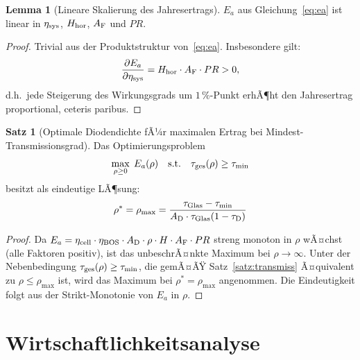 ﻿\documentclass[a4paper,12pt]{article}
\theoremstyle{definition}
\newtheorem{lemma}[definition]{Lemma}
\newtheorem{satz}[definition]{Satz}
\theoremstyle{remark}
\begin{document}
\begin{lemma}[Lineare Skalierung des Jahresertrags]
\label{lem:linear}
$E_a$ aus Gleichung~\eqref{eq:ea} ist linear in $\eta_{\rm sys}$,
$H_{\rm hor}$, $A_{\rm F}$ und $PR$.
\end{lemma}

\begin{proof}
Trivial aus der Produktstruktur von~\eqref{eq:ea}. Insbesondere gilt:
\begin{equation*}
  \frac{\partial E_a}{\partial \eta_{\rm sys}} = H_{\rm hor} \cdot A_{\rm F} \cdot PR > 0,
\end{equation*}
d.h.~jede Steigerung des Wirkungsgrads um $1\,\%$-Punkt erhÃ¶ht den Jahresertrag
proportional, ceteris paribus.
\end{proof}

\begin{satz}[Optimale Diodendichte fÃ¼r maximalen Ertrag bei Mindest-Transmissionsgrad]
\label{satz:opt}
Das Optimierungsproblem
\begin{equation}
  \max_{\rho \geq 0} \; E_a(\rho) \quad \text{s.t.} \quad \tau_{\rm ges}(\rho) \geq \tau_{\min}
  \label{eq:optproblem}
\end{equation}
besitzt als eindeutige LÃ¶sung:
\begin{equation}
  \rho^* = \rho_{\max} = \frac{\tau_{\rm Glas} - \tau_{\min}}{A_{\rm D} \cdot \tau_{\rm Glas}(1-\tau_{\rm D})}
  \label{eq:rhoopt}
\end{equation}
\end{satz}

\begin{proof}
Da $E_a = \eta_{\rm cell} \cdot \eta_{\rm BOS} \cdot A_{\rm D} \cdot \rho \cdot H \cdot A_{\rm F} \cdot PR$
streng monoton in $\rho$ wÃ¤chst (alle Faktoren positiv), ist das unbeschrÃ¤nkte
Maximum bei $\rho \to \infty$. Unter der Nebenbedingung
$\tau_{\rm ges}(\rho) \geq \tau_{\min}$, die gemÃ¤ÃŸ Satz~\ref{satz:transmiss}
Ã¤quivalent zu $\rho \leq \rho_{\max}$ ist, wird das Maximum bei
$\rho^* = \rho_{\max}$ angenommen. Die Eindeutigkeit folgt aus der
Strikt-Monotonie von $E_a$ in $\rho$.
\end{proof}

\section{Wirtschaftlichkeitsanalyse}
\label{sec:wirtschaft}
\end{document}
